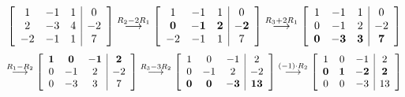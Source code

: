 \documentclass[10pt]{article}
\newenvironment{augmentedmatrix}[1] %
{\left[\begin{array}{#1}}
    {\end{array}\right]}
\theoremstyle{definition}
\begin{document}
\begin{equation*}
  \begin{augmentedmatrix}{ccc|c}
    1& -1& 1& 0 \\
    2& -3& 4& -2 \\
    -2& -1& 1& 7
  \end{augmentedmatrix}
  \overset{R_{2}-2R_{1}}{\longrightarrow}
  \begin{augmentedmatrix}{ccc|c}
    1& -1& 1& 0 \\
    \mathbf{0}& \mathbf{-1}& \mathbf{2}& \mathbf{-2} \\
    -2& -1& 1& 7
  \end{augmentedmatrix}
  \overset{R_{3}+2R_{1}}{\longrightarrow}
  \begin{augmentedmatrix}{ccc|c}
    1& -1& 1& 0 \\
    0& -1& 2& -2 \\
    \mathbf{0}& \mathbf{-3}& \mathbf{3}& \mathbf{7}
  \end{augmentedmatrix}
\end{equation*}
\begin{equation*}
  \overset{R_{1}-R_{2}}{\longrightarrow}
  \begin{augmentedmatrix}{ccc|c}
    \mathbf{1}& \mathbf{0}& \mathbf{-1}& \mathbf{2} \\
    0& -1& 2& -2 \\
    0& -3& 3& 7
  \end{augmentedmatrix}
  \overset{R_{3}-3R_{2}}{\longrightarrow}
  \begin{augmentedmatrix}{ccc|c}
    1& 0& -1& 2 \\
    0& -1& 2& -2 \\
    \mathbf{0}& \mathbf{0}& \mathbf{-3}& \mathbf{13}
  \end{augmentedmatrix}
  \overset{(-1)\cdot R_{2}}{\longrightarrow}
  \begin{augmentedmatrix}{ccc|c}
    1& 0& -1& 2 \\
    \mathbf{0}& \mathbf{1}& \mathbf{-2}& \mathbf{2} \\
    0& 0& -3& 13
  \end{augmentedmatrix}
\end{equation*}
\end{document}
